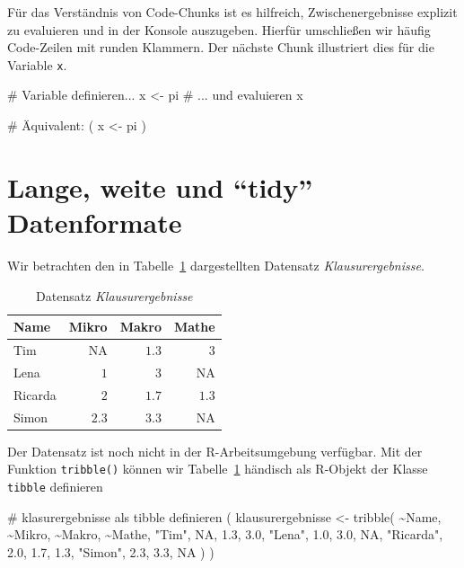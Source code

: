 \documentclass[
  a4paper,
  DIV=11,
  oneside]{scrreprt}
\newenvironment{Shaded}{\begin{snugshade}}{\end{snugshade}}
\newcommand{\NormalTok}[1]{\textcolor[rgb]{0.00,0.23,0.31}{#1}}
\begin{document}
Für das Verständnis von Code-Chunks ist es hilfreich, Zwischenergebnisse
explizit zu evaluieren und in der Konsole auszugeben. Hierfür
umschließen wir häufig Code-Zeilen mit runden Klammern. Der nächste
Chunk illustriert dies für die Variable \texttt{x}.

\begin{Shaded}
\begin{Highlighting}[]
\NormalTok{\# Variable definieren...}
\NormalTok{x \textless{}{-} pi}
\NormalTok{\# ... und evaluieren}
\NormalTok{x}

\NormalTok{\# Äquivalent:}
\NormalTok{(}
\NormalTok{  x \textless{}{-} pi}
\NormalTok{)}
\end{Highlighting}
\end{Shaded}

\hypertarget{lange-weite-und-tidy-datenformate}{%
\section{Lange, weite und ``tidy''
Datenformate}\label{lange-weite-und-tidy-datenformate}}

Wir betrachten den in Tabelle~\ref{tbl-Klausurergebnisse} dargestellten
Datensatz \emph{Klausurergebnisse}.

\hypertarget{tbl-Klausurergebnisse}{}
\begin{longtable}{lrrr}
\caption{\label{tbl-Klausurergebnisse}Datensatz \emph{Klausurergebnisse} }\tabularnewline

\toprule
Name & Mikro & Makro & Mathe \\ 
\midrule\addlinespace[2.5pt]
Tim & NA & $1.3$ & $3$ \\ 
Lena & $1$ & $3$ & NA \\ 
Ricarda & $2$ & $1.7$ & $1.3$ \\ 
Simon & $2.3$ & $3.3$ & NA \\ 
\bottomrule
\end{longtable}

Der Datensatz ist noch nicht in der R-Arbeitsumgebung verfügbar. Mit der
Funktion \texttt{tribble()} können wir
Tabelle~\ref{tbl-Klausurergebnisse} händisch als R-Objekt der Klasse
\texttt{tibble} definieren

\begin{Shaded}
\begin{Highlighting}[]
\NormalTok{\# \textquotesingle{}klasurergebnisse\textquotesingle{} als tibble definieren}
\NormalTok{(}
\NormalTok{  klausurergebnisse \textless{}{-} tribble(}
\NormalTok{    \textasciitilde{}Name,    \textasciitilde{}Mikro, \textasciitilde{}Makro, \textasciitilde{}Mathe,}
\NormalTok{    "Tim",        NA,    1.3,    3.0,}
\NormalTok{    "Lena",      1.0,    3.0,     NA,}
\NormalTok{    "Ricarda",   2.0,    1.7,    1.3,}
\NormalTok{    "Simon",     2.3,    3.3,     NA}
\NormalTok{  )}
\NormalTok{)}
\end{Highlighting}
\end{Shaded}
\end{document}
